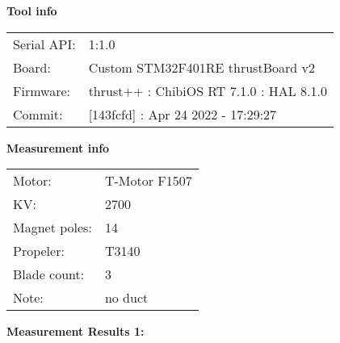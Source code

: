 \documentclass[10pt]{article}
\begin{document}
\noindent
{\large \bf Tool info}
\vspace{3mm}

\noindent
\begin{tabular}{ll}
Serial API:  & 1:1.0\\ 
Board:       & Custom STM32F401RE thrustBoard v2\\ 
Firmware:    & thrust++ : ChibiOS RT 7.1.0 : HAL 8.1.0\\ 
Commit:      & [143fcfd] : Apr 24 2022 - 17:29:27
\end{tabular}
\vspace{3mm}

\noindent
{\large \bf Measurement info}
\vspace{3mm}

\noindent
\begin{tabular}{ll}
Motor:        & T-Motor F1507\\ 
KV:           & 2700\\ 
Magnet poles: & 14\\ 
Propeler:     & T3140\\ 
Blade count:  & 3\\ 
Note:         & no duct
\end{tabular}

\vspace{3mm}

\noindent
{\large \bf Measurement Results 1:}
\vspace{3mm}
\end{document}
